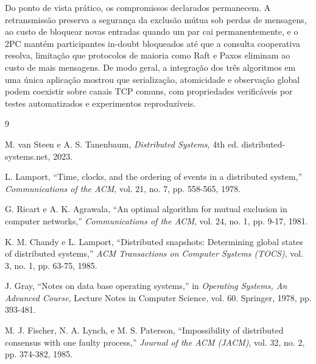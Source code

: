 \documentclass[conference]{IEEEtran}
\begin{document}
Do ponto de vista prático, os compromissos declarados permanecem. A
retransmissão preserva a segurança da exclusão mútua sob perdas de mensagens,
ao custo de bloquear novas entradas quando um par cai permanentemente, e o
2PC mantém participantes in-doubt bloqueados até que a consulta cooperativa
resolva, limitação que protocolos de maioria como Raft e Paxos eliminam ao
custo de mais mensagens. De modo geral, a integração dos três algoritmos em
uma única aplicação mostrou que serialização, atomicidade e observação global
podem coexistir sobre canais TCP comuns, com propriedades verificáveis por
testes automatizados e experimentos reproduzíveis.

\begin{thebibliography}{9}

M. van Steen e A. S. Tanenbaum, \emph{Distributed Systems}, 4th ed. distributed-systems.net, 2023.

L. Lamport, ``Time, clocks, and the ordering of events in a distributed system,'' \emph{Communications of the ACM}, vol. 21, no. 7, pp. 558-565, 1978.

G. Ricart e A. K. Agrawala, ``An optimal algorithm for mutual exclusion in computer networks,'' \emph{Communications of the ACM}, vol. 24, no. 1, pp. 9-17, 1981.

K. M. Chandy e L. Lamport, ``Distributed snapshots: Determining global states of distributed systems,'' \emph{ACM Transactions on Computer Systems (TOCS)}, vol. 3, no. 1, pp. 63-75, 1985.

J. Gray, ``Notes on data base operating systems,'' in \emph{Operating Systems, An Advanced Course}, Lecture Notes in Computer Science, vol. 60. Springer, 1978, pp. 393-481.

M. J. Fischer, N. A. Lynch, e M. S. Paterson, ``Impossibility of distributed consensus with one faulty process,'' \emph{Journal of the ACM (JACM)}, vol. 32, no. 2, pp. 374-382, 1985.

\end{thebibliography}
\end{document}
